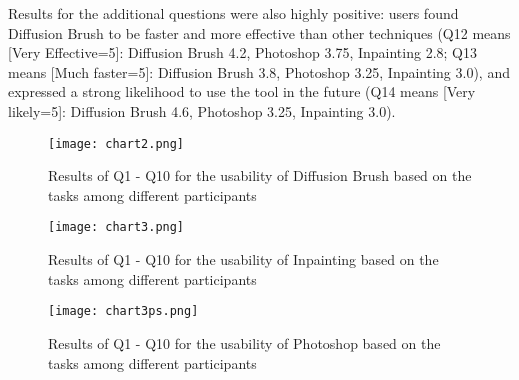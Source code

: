 \documentclass[10pt,twocolumn,letterpaper]{article}
\begin{document}
Results for the additional questions were also highly positive: users found Diffusion Brush to be faster and more effective than other techniques (Q12 means [Very Effective=5]: Diffusion Brush 4.2, Photoshop 3.75, Inpainting 2.8; Q13 means [Much faster=5]: Diffusion Brush 3.8, Photoshop 3.25, Inpainting 3.0), and expressed a strong likelihood to use the tool in the future (Q14 means [Very likely=5]: Diffusion Brush 4.6, Photoshop 3.25, Inpainting 3.0).

\begin{figure}[!ht]
  \centering
  
        \texttt{[image: chart2.png]}
\caption{Results of Q1 - Q10 for the usability of Diffusion Brush based on the tasks among different participants}
\label{dif-res}
\end{figure}

\begin{figure}[!ht]
  \centering
  
        \texttt{[image: chart3.png]}
\caption{Results of Q1 - Q10 for the usability of Inpainting based on the tasks among different participants}
\label{inp-res}
\end{figure}

\begin{figure}[!ht]
  \centering
  
        \texttt{[image: chart3ps.png]}
\caption{Results of Q1 - Q10 for the usability of Photoshop based on the tasks among different participants}
\label{ps-res}
\end{figure}
\end{document}
